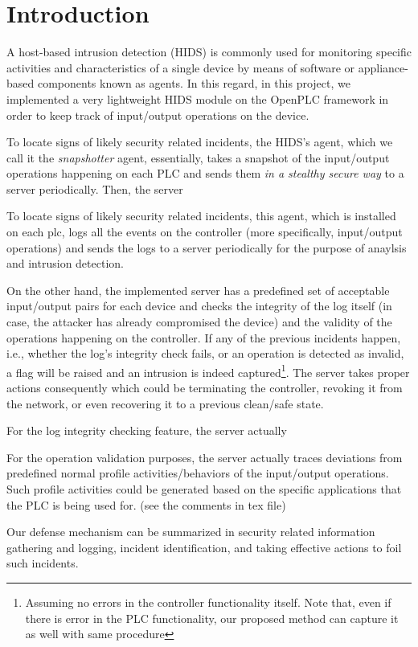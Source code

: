 
\section{Introduction}

A host-based intrusion detection (HIDS) is commonly used for monitoring specific activities and characteristics of a single device by means of software or appliance-based components known as agents. In this regard, in this project, we implemented a very lightweight HIDS module on the OpenPLC framework in order to keep track of input/output operations on the device.

To locate signs of likely security related incidents, the HIDS's agent, which we call it the \emph{snapshotter} agent, essentially, takes a snapshot of the input/output operations
happening on each PLC and sends them \emph{in a stealthy secure way} to a server periodically. Then, the server 

To locate signs of likely security related incidents, this agent, which is installed on each plc, logs all the events on the controller (more specifically, input/output operations) and sends the logs to a server periodically for the purpose of anaylsis and intrusion detection. 

On the other hand, the implemented server has a predefined set of acceptable input/output pairs for each device and checks the integrity of the log itself (in case, the attacker has already compromised the device) and the validity of the operations happening on the controller. If any of the previous incidents happen, i.e., whether the log's integrity check fails, or an operation is detected as invalid, a flag will be raised and an intrusion is indeed captured\footnote{Assuming no errors in the controller functionality itself. Note that, even if there is error in the PLC functionality, our proposed method can capture it as well with same procedure}. The server takes proper actions consequently which could be terminating the controller, revoking it from the network, or even recovering it to a previous clean/safe state.

For the log integrity checking feature, the server actually 

For the operation validation purposes, the server actually traces deviations from predefined normal profile activities/behaviors of the input/output operations. Such profile activities could be generated based on the specific applications that the PLC is being used for. (see the comments in tex file)

Our defense mechanism can be summarized in security related information gathering and logging, incident identification, and taking effective actions to foil such incidents.




